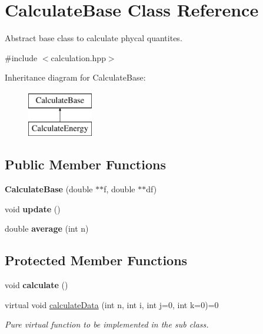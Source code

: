 \hypertarget{class_calculate_base}{}\section{Calculate\+Base Class Reference}
\label{class_calculate_base}


Abstract base class to calculate phycal quantites.  




{\ttfamily \#include $<$calculation.\+hpp$>$}

Inheritance diagram for Calculate\+Base\+:\begin{figure}[H]
\begin{center}
\leavevmode
\includegraphics[height=2.000000cm]{class_calculate_base}
\end{center}
\end{figure}
\subsection*{Public Member Functions}
\begin{DoxyCompactItemize}
\item 
\mbox{\label{class_calculate_base_a6ff55898f914b7d8843a44c19848dc63}} 
{\bfseries Calculate\+Base} (double $\ast$$\ast$f, double $\ast$$\ast$df)
\item 
\mbox{\label{class_calculate_base_aa201990f71721e008b9168fc2fee1dd1}} 
void {\bfseries update} ()
\item 
\mbox{\label{class_calculate_base_a9befdcb41010d4fb5e38891fb31c00a7}} 
double {\bfseries average} (int n)
\end{DoxyCompactItemize}
\subsection*{Protected Member Functions}
\begin{DoxyCompactItemize}
\item 
\mbox{\label{class_calculate_base_a9e56aaaaf9f0044049d37440fb135e2b}} 
void {\bfseries calculate} ()
\item 
\mbox{\label{class_calculate_base_a92d2b3012524704ffd8b87b5ac5a8888}} 
virtual void \mbox{\hyperlink{class_calculate_base_a92d2b3012524704ffd8b87b5ac5a8888}{calculate\+Data}} (int n, int i, int j=0, int k=0)=0
\begin{DoxyCompactList}\small\item\em Pure virtual function to be implemented in the sub class. \end{DoxyCompactList}\end{DoxyCompactItemize}
